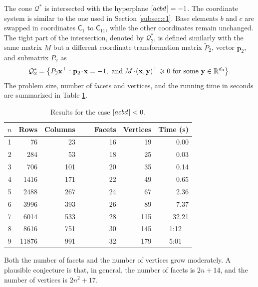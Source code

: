 \documentclass[reqno]{amsart}
\theoremstyle{definition}
\newcommand\tsp{\mkern 1.5mu}
\renewcommand\ge{\geqslant}\renewcommand\le{\leqslant}
\newcommand\Co{\mathsf C} %
\newcommand\R{\mathbb R}  %
\newcommand\T{\top}       %
\def\m#1{\tsp{#1}\tsp}
\def\acbd{[acbd\tsp]}
\begin{document}
The cone $\mathcal Q^*$ is intersected with the hyperplane $\acbd=-1$. The
coordinate system is similar to the one used in Section \ref{subsec:c1}.
Base elements $b$ and $c$ are swapped in coordinates $\Co_{1}$ to
$\Co_{11}$, while the other coordinates remain unchanged. The tight part of
the intersection, denoted by $\mathcal Q^*_2$, is defined similarly with the
same matrix $M$ but a different coordinate transformation matrix $\tilde
P_2$, vector $\mathbf p_2$, and submatrix $P_2$ as
\begin{equation}\label{eq:Q2}
   \mathcal Q^*_2 = \big\{ P_2\mathbf x^\T:
            \mathbf p_2\m\cdot\mathbf x=-1, \mbox{ and }
            M\m\cdot (\mathbf x,\mathbf y)^\T \ge 0
            \mbox{ for some }\mathbf y\in\R^{d_3} \big\}.
\end{equation}
The problem size, number of facets and vertices, and the running time in
seconds are summarized in Table \ref{table:9}.
\begin{table}[h!bt]
\def\bb{\kern -5pt}
\begin{tabular}{crrrrr}
$n$ & Rows & Columns\bb & ~~~Facets\bb & Vertices\bb & Time (s)\bb  \\
\hline
\rule{0pt}{11pt}%
1   & 76   &  23     &  16    &    19    &  0.00 \\
2   & 284  &  53     &  18    &    25    &  0.03 \\
3   & 706  & 101     &  20    &    35    &  0.14 \\
4   & 1416 & 171     &  22    &    49    &  0.65 \\
5   & 2488 & 267     &  24    &    67    &  2.36 \\
6   & 3996 & 393     &  26    &    89    &  7.37 \\
7   & 6014 & 533     &  28    &   115    & 32.21 \\
8   & 8616 & 751     &  30    &   145    & 1:12~\;~{\space} \\
9   & 11876 & 991    &  32    &   179    & 5:01~\;~{\space} \\
\hline
\end{tabular}

\vskip 5pt

\caption{Results for the case $\acbd<0$.}\label{table:9}
\end{table}
Both the number of facets and the number of vertices grow moderately. A
plausible conjecture is that, in general, the number of facets is $2n+14$,
and the number of vertices is $2n^2+17$.
\end{document}
